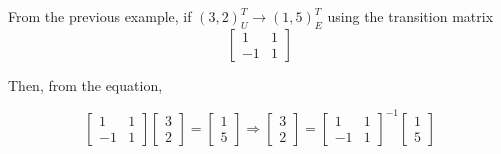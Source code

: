 \begin{example}


From the previous example, if $(3,2)_U^T \rightarrow (1,5)_E^T$ using the transition matrix 
\[   \begin{bmatrix}  1 & 1\\ -1 & 1\end{bmatrix}  \]

Then, from the equation, 

  \[  \begin{bmatrix}  1 & 1\\ -1 & 1\end{bmatrix} \begin{bmatrix} 3\\2 \end{bmatrix} = \begin{bmatrix} 1\\5 \end{bmatrix}    \Longrightarrow    \begin{bmatrix} 3\\2 \end{bmatrix} = \begin{bmatrix}  1 & 1\\ -1 & 1\end{bmatrix}^{-1}   \begin{bmatrix} 1\\5 \end{bmatrix}   \]



 	
	
\end{example}



